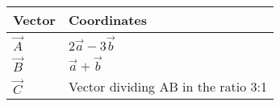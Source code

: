 \begin{tabular}{|m{5em}|m{10em}|}
    \hline
    \textbf{Vector} &\textbf{Coordinates} \\
    \hline
         $\vec{A}$ & $2\vec{a}-3\vec{b}$ \\
    \hline
        $\vec{B}$ & $\vec{a}+\vec{b}$ \\
    \hline
	$\vec{C}$ & Vector dividing AB in the ratio 3:1 \\
    \hline
\end{tabular}
